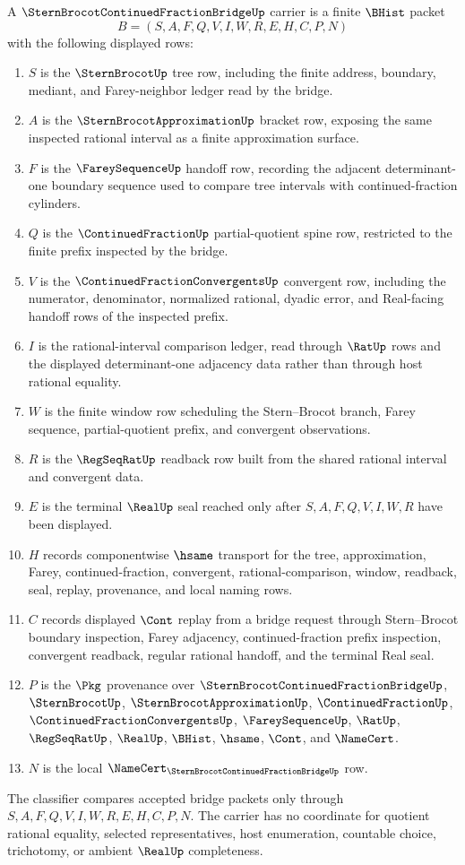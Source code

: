 \begin{definition}
\label{def:stern-brocot-continued-fraction-bridge-carrier}
A $\SternBrocotContinuedFractionBridgeUp$ carrier is a finite $\BHist$ packet
$$
B=(S,A,F,Q,V,I,W,R,E,H,C,P,N)
$$
with the following displayed rows:
\begin{enumerate}
\item $S$ is the $\SternBrocotUp$ tree row, including the finite address, boundary, mediant, and Farey-neighbor ledger read by the bridge.
\item $A$ is the $\SternBrocotApproximationUp$ bracket row, exposing the same inspected rational interval as a finite approximation surface.
\item $F$ is the $\FareySequenceUp$ handoff row, recording the adjacent determinant-one boundary sequence used to compare tree intervals with continued-fraction cylinders.
\item $Q$ is the $\ContinuedFractionUp$ partial-quotient spine row, restricted to the finite prefix inspected by the bridge.
\item $V$ is the $\ContinuedFractionConvergentsUp$ convergent row, including the numerator, denominator, normalized rational, dyadic error, and Real-facing handoff rows of the inspected prefix.
\item $I$ is the rational-interval comparison ledger, read through $\RatUp$ rows and the displayed determinant-one adjacency data rather than through host rational equality.
\item $W$ is the finite window row scheduling the Stern--Brocot branch, Farey sequence, partial-quotient prefix, and convergent observations.
\item $R$ is the $\RegSeqRatUp$ readback row built from the shared rational interval and convergent data.
\item $E$ is the terminal $\RealUp$ seal reached only after $S,A,F,Q,V,I,W,R$ have been displayed.
\item $H$ records componentwise $\hsame$ transport for the tree, approximation, Farey, continued-fraction, convergent, rational-comparison, window, readback, seal, replay, provenance, and local naming rows.
\item $C$ records displayed $\Cont$ replay from a bridge request through Stern--Brocot boundary inspection, Farey adjacency, continued-fraction prefix inspection, convergent readback, regular rational handoff, and the terminal Real seal.
\item $P$ is the $\Pkg$ provenance over $\SternBrocotContinuedFractionBridgeUp$, $\SternBrocotUp$, $\SternBrocotApproximationUp$, $\ContinuedFractionUp$, $\ContinuedFractionConvergentsUp$, $\FareySequenceUp$, $\RatUp$, $\RegSeqRatUp$, $\RealUp$, $\BHist$, $\hsame$, $\Cont$, and $\NameCert$.
\item $N$ is the local $\NameCert_{\SternBrocotContinuedFractionBridgeUp}$ row.
\end{enumerate}
The classifier compares accepted bridge packets only through $S,A,F,Q,V,I,W,R,E,H,C,P,N$. The carrier has no coordinate for quotient rational equality, selected representatives, host enumeration, countable choice, trichotomy, or ambient $\RealUp$ completeness.
\end{definition}

